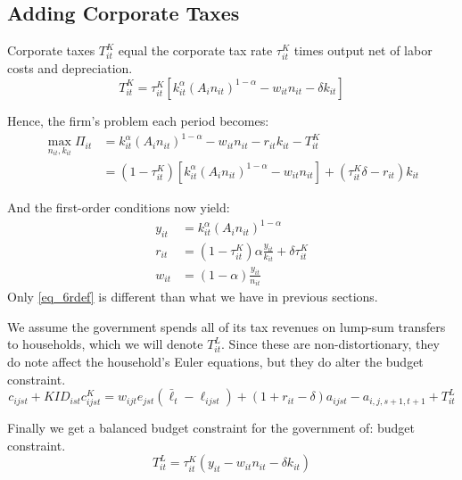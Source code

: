 \documentclass[letterpaper,12pt]{article}
\theoremstyle{definition}
\numberwithin{equation}{section}
\begin{document}
\begin{spacing}{1.5}
\newpage
\section{Adding Corporate Taxes}
	Corporate taxes $T^K_{it}$ equal the corporate tax rate $\tau^K_{it}$ times output net of labor costs and depreciation.
	\begin{equation}
		T^K_{it} = \tau^K_{it} \left[ k_{it}^\alpha \left( A_{i} n_{it} \right)^{1-\alpha} - w_{it}n_{it} - \delta k_{it} \right]
	\end{equation}

	Hence, the firm's problem each period becomes:
	\begin{align}
		\max_{n_{it},k_{it}} \Pi_{it} & = k_{it}^\alpha \left( A_{i} n_{it} \right)^{1-\alpha} - w_{it}n_{it} - r_{it}k_{it} - T^K_{it} \nonumber \\
		& = (1-\tau^K_{it})\left[k_{it}^\alpha \left( A_{i} n_{it} \right)^{1-\alpha} - w_{it}n_{it}\right] + (\tau^K_{it} \delta - r_{it})k_{it} \nonumber
	\end{align}	

	And the first-order conditions now yield:
	\begin{align}
		y_{it} & = k_{it}^\alpha \left( A_{i} n_{it} \right)^{1-\alpha} \nonumber \\
		r_{it} & = (1-\tau^K_{it})\alpha \frac{y_{it}}{k_{it}} + \delta \tau^K_{it} \label{eq_6rdef} \\
		w_{it} & = (1-\alpha) \frac{y_{it}}{n_{it}} \nonumber
	\end{align}
	Only \eqref{eq_6rdef} is different than what we have in previous sections.

	We assume the government spends all of its tax revenues on lump-sum transfers to households, which we will denote $T^L_{it}$.  Since these are non-distortionary, they do note affect the household's Euler equations, but they do alter the budget constraint.
	\begin{equation} \nonumber
		c_{ijst} + KID_{ist}c^K_{ijst} = w_{ijt} e_{jst} (\bar \ell_t -\ell_{ijst}) + (1+r_{it}-\delta)a_{ijst} - a_{i,j,s+1,t+1} + T^L_{it}
	\end{equation}

	Finally we get a balanced budget constraint for the government of:
	budget constraint.
	\begin{equation} \nonumber
		T^L_{it} = \tau^K_{it} (y_{it} - w_{it}n_{it} - \delta k_{it})
	\end{equation}


\end{spacing}
\end{document}
